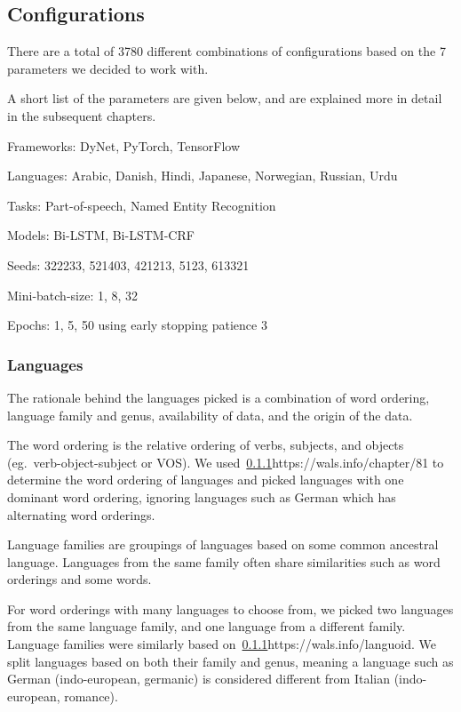 
\subsection{Configurations}

There are a total of 3780 different combinations of configurations based on the
7 parameters we decided to work with. 

A short list of the parameters are given below, and are explained more in detail
in the subsequent chapters.

Frameworks: DyNet, PyTorch, TensorFlow

Languages: Arabic, Danish, Hindi, Japanese, Norwegian, Russian, Urdu

Tasks: Part-of-speech, Named Entity Recognition

Models: Bi-LSTM, Bi-LSTM-CRF

Seeds: 322233, 521403, 421213, 5123, 613321

Mini-batch-size: 1, 8, 32

Epochs: 1, 5, 50 using early stopping patience 3


\subsubsection{Languages}

The rationale behind the languages picked is a combination of word ordering,
language family and genus, availability of data, and the origin of the data.

The word ordering is the relative ordering of verbs, subjects, and objects (eg.\
verb-object-subject or VOS). We used~\ref{}{https://wals.info/chapter/81} to
determine the word ordering of languages and picked languages with one dominant
word ordering, ignoring languages such as German which has alternating word
orderings.

Language families are groupings of languages based on some common ancestral
language. Languages from the same family often share similarities such as word
orderings and some words. 

For word orderings with many languages to choose from, we picked two languages
from the same language family, and one language from a different family.
Language families were similarly based on~\ref{}{https://wals.info/languoid}. We
split languages based on both their family and genus, meaning a language such as
German (indo-european, germanic) is considered different from Italian
(indo-european, romance).

